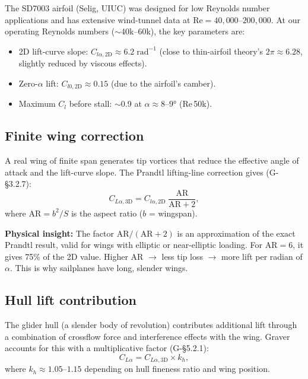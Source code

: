 \documentclass[11pt,a4paper]{article}
\newcommand{\insight}[1]{\par\smallskip\noindent\colorbox{green!8}{\parbox{\dimexpr\linewidth-2\fboxsep}{%
  \small\textbf{Physical insight:} #1}}\smallskip}
\begin{document}
The SD7003 airfoil (Selig, UIUC) was designed for low Reynolds number applications
and has extensive wind-tunnel data at $\mathrm{Re}=40{,}000$--$200{,}000$.
At our operating Reynolds numbers ($\sim$40k--60k), the key parameters are:

\begin{itemize}[nosep]
  \item 2D lift-curve slope: $C_{l\alpha,\text{2D}} \approx 6.2\;\mathrm{rad}^{-1}$
    (close to thin-airfoil theory's $2\pi\approx6.28$, slightly reduced by viscous effects).
  \item Zero-$\alpha$ lift: $C_{l0,\text{2D}} \approx 0.15$ (due to the airfoil's camber).
  \item Maximum $C_l$ before stall: $\sim$0.9 at $\alpha\approx8$--$9°$ (Re\,50k).
\end{itemize}

\subsection{Finite wing correction}

A real wing of finite span generates tip vortices that reduce the effective angle of
attack and the lift-curve slope.  The Prandtl lifting-line correction
gives (G-\S3.2.7):
\begin{equation}
  C_{L\alpha,\text{3D}} = C_{l\alpha,\text{2D}}\;\frac{\mathrm{AR}}{\mathrm{AR}+2},
  \label{eq:CLa3d}
\end{equation}
where $\mathrm{AR}=b^2/S$ is the aspect ratio ($b$ = wingspan).

\insight{The factor $\mathrm{AR}/(\mathrm{AR}+2)$ is an approximation of the exact
Prandtl result, valid for wings with elliptic or near-elliptic loading.  For
$\mathrm{AR}=6$, it gives 75\% of the 2D value.  Higher AR $\rightarrow$ less tip
loss $\rightarrow$ more lift per radian of $\alpha$.  This is why sailplanes have
long, slender wings.}

\subsection{Hull lift contribution}

The glider hull (a slender body of revolution) contributes additional lift through
a combination of crossflow force and interference effects with the wing.  Graver
accounts for this with a multiplicative factor (G-\S5.2.1):
\begin{equation}
  C_{L\alpha} = C_{L\alpha,\text{3D}} \times k_h,
  \label{eq:CLa_total}
\end{equation}
where $k_h \approx 1.05$--$1.15$ depending on hull fineness ratio and wing position.
\end{document}
